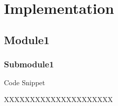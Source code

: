 \chapter{Implementation}

\section{Module1}

\subsection{Submodule1}
Code Snippet

XXXXXXXXXXXXXXXXXXXXX
